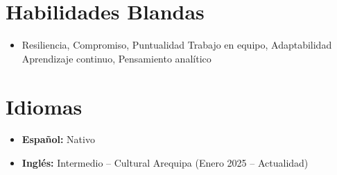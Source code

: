 \documentclass[11pt,a4paper,sans]{moderncv}
\begin{document}
\section{Habilidades Blandas}
{\begin{itemize}[label=\textbullet]
\item Resiliencia, Compromiso, Puntualidad Trabajo en equipo, Adaptabilidad Aprendizaje continuo, Pensamiento analítico
\end{itemize}}

\section{Idiomas}
\begin{itemize}[label=\textbullet]
    \item {\textbf{Español:} Nativo}
    \item {\textbf{Inglés:} Intermedio – Cultural Arequipa (Enero 2025 – Actualidad)}
\end{itemize}
\end{document}
